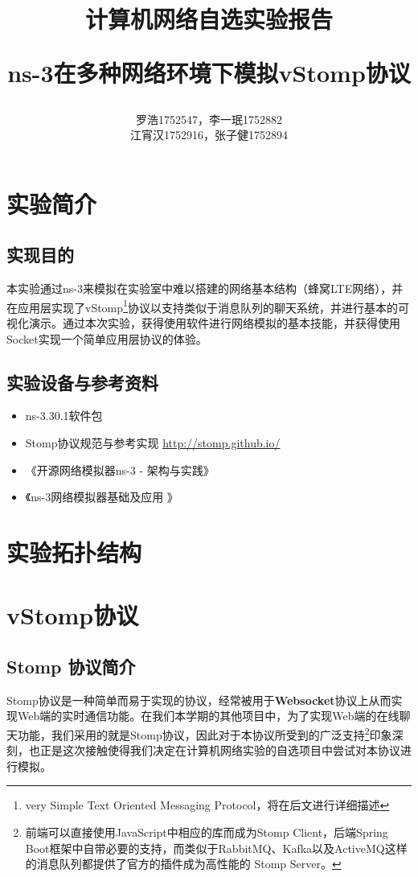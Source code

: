 \documentclass{ctexrep}
\title{\textbf{计算机网络自选实验报告} \\ [2ex] \begin{large} ns-3在多种网络环境下模拟vStomp协议 \end{large} }
\author{罗浩1752547，李一珉1752882\\江宵汉1752916，张子健1752894}
\date{}
\begin{document}
	\maketitle
	\tableofcontents
	
	\chapter{实验简介}
	\section{实现目的}
	本实验通过ns-3来模拟在实验室中难以搭建的网络基本结构（蜂窝LTE网络），并在应用层实现了vStomp\footnote{very Simple Text Oriented Messaging Protocol，将在后文进行详细描述}协议以支持类似于消息队列的聊天系统，并进行基本的可视化演示。通过本次实验，获得使用软件进行网络模拟的基本技能，并获得使用Socket实现一个简单应用层协议的体验。
	\section{实验设备与参考资料}
	\begin{itemize}
		\item ns-3.30.1软件包
		\item Stomp协议规范与参考实现 \url{http://stomp.github.io/}
		\item 《开源网络模拟器ns-3 - 架构与实践》
		\item 《ns-3网络模拟器基础及应用 》
	\end{itemize}
	\chapter{实验拓扑结构}
	
	\chapter{vStomp协议}
	\section{Stomp 协议简介}
	Stomp协议是一种简单而易于实现的协议，经常被用于\textbf{Websocket}协议上从而实现Web端的实时通信功能。在我们本学期的其他项目中，为了实现Web端的在线聊天功能，我们采用的就是Stomp协议，因此对于本协议所受到的广泛支持\footnote{前端可以直接使用JavaScript中相应的库而成为Stomp Client，后端Spring Boot框架中自带必要的支持，而类似于RabbitMQ、Kafka以及ActiveMQ这样的消息队列都提供了官方的插件成为高性能的 Stomp Server。}印象深刻，也正是这次接触使得我们决定在计算机网络实验的自选项目中尝试对本协议进行模拟。
	
\end{document}
